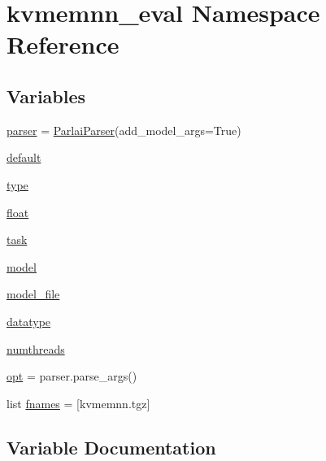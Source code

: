 \hypertarget{namespacekvmemnn__eval}{}\section{kvmemnn\+\_\+eval Namespace Reference}
\label{namespacekvmemnn__eval}
\subsection*{Variables}
\begin{DoxyCompactItemize}
\item 
\hyperlink{namespacekvmemnn__eval_af5fc7707b5c6eee8e4cd13b444afee22}{parser} = \hyperlink{classparlai_1_1core_1_1params_1_1ParlaiParser}{Parlai\+Parser}(add\+\_\+model\+\_\+args=True)
\item 
\hyperlink{namespacekvmemnn__eval_a6f35cf4c95dc84deca22e92e0a5b2f5b}{default}
\item 
\hyperlink{namespacekvmemnn__eval_a07ce55fd0997ccd4b5ff1cec6b2e254e}{type}
\item 
\hyperlink{namespacekvmemnn__eval_a386b992fade09eeb52f9a80f477eb44c}{float}
\item 
\hyperlink{namespacekvmemnn__eval_a6f65ac8e4e08e7bebc38275bdc0f8c09}{task}
\item 
\hyperlink{namespacekvmemnn__eval_ad5b2f4f5ab0479b8246c1d9843705a58}{model}
\item 
\hyperlink{namespacekvmemnn__eval_a37c481230f8d490ea8420a850345a15b}{model\+\_\+file}
\item 
\hyperlink{namespacekvmemnn__eval_a47b0a455cb7fd572ea0506f9baa35936}{datatype}
\item 
\hyperlink{namespacekvmemnn__eval_a13f12946c0516cdb9498eb9533781bf2}{numthreads}
\item 
\hyperlink{namespacekvmemnn__eval_a8db66d16d4ad108a59930022621f052a}{opt} = parser.\+parse\+\_\+args()
\item 
list \hyperlink{namespacekvmemnn__eval_a669fed16314bac6d94157f4f1ba3ece3}{fnames} = \mbox{[}\textquotesingle{}kvmemnn.\+tgz\textquotesingle{}\mbox{]}
\end{DoxyCompactItemize}


\subsection{Variable Documentation}
\mbox{\label{namespacekvmemnn__eval_a47b0a455cb7fd572ea0506f9baa35936}} 

